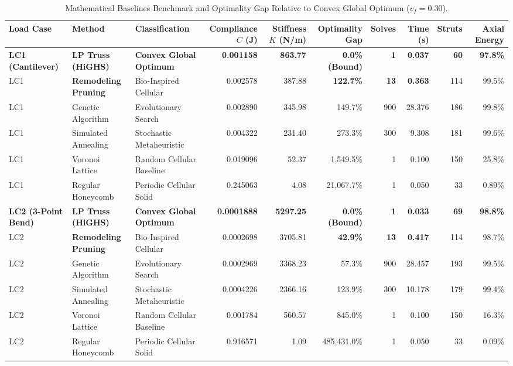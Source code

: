 \documentclass[10pt,journal,compsoc]{IEEEtran}
\begin{document}
\begin{table}[t]
\caption{Mathematical Baselines Benchmark and Optimality Gap Relative to Convex Global Optimum ($v_f = 0.30$).}
\label{tab:baselines_gap}
\centering
\scriptsize
\begin{tabular}{lllrrrrrrr}
\toprule
Load Case & Method & Classification & Compliance $C$ (J) & Stiffness $K$ (N/m) & Optimality Gap & Solves & Time (s) & Struts & Axial Energy \\
\midrule
\textbf{LC1 (Cantilever)} & \textbf{LP Truss (HiGHS)} & \textbf{Convex Global Optimum} & \textbf{0.001158} & \textbf{863.77} & \textbf{0.0\% (Bound)} & \textbf{1} & \textbf{0.037} & \textbf{60} & \textbf{97.8\%} \\
LC1 & \textbf{Remodeling Pruning} & Bio-Inspired Cellular & 0.002578 & 387.88 & \textbf{122.7\%} & \textbf{13} & \textbf{0.363} & 114 & 99.5\% \\
LC1 & Genetic Algorithm & Evolutionary Search & 0.002890 & 345.98 & 149.7\% & 900 & 28.376 & 186 & 99.8\% \\
LC1 & Simulated Annealing & Stochastic Metaheuristic & 0.004322 & 231.40 & 273.3\% & 300 & 9.308 & 181 & 99.6\% \\
LC1 & Voronoi Lattice & Random Cellular Baseline & 0.019096 & 52.37 & 1,549.5\% & 1 & 0.100 & 150 & 25.8\% \\
LC1 & Regular Honeycomb & Periodic Cellular Solid & 0.245063 & 4.08 & 21,067.7\% & 1 & 0.050 & 33 & 0.89\% \\
\midrule
\textbf{LC2 (3-Point Bend)} & \textbf{LP Truss (HiGHS)} & \textbf{Convex Global Optimum} & \textbf{0.0001888} & \textbf{5297.25} & \textbf{0.0\% (Bound)} & \textbf{1} & \textbf{0.033} & \textbf{69} & \textbf{98.8\%} \\
LC2 & \textbf{Remodeling Pruning} & Bio-Inspired Cellular & 0.0002698 & 3705.81 & \textbf{42.9\%} & \textbf{13} & \textbf{0.417} & 114 & 98.7\% \\
LC2 & Genetic Algorithm & Evolutionary Search & 0.0002969 & 3368.23 & 57.3\% & 900 & 28.457 & 193 & 99.5\% \\
LC2 & Simulated Annealing & Stochastic Metaheuristic & 0.0004226 & 2366.16 & 123.9\% & 300 & 10.178 & 179 & 99.4\% \\
LC2 & Voronoi Lattice & Random Cellular Baseline & 0.001784 & 560.57 & 845.0\% & 1 & 0.100 & 150 & 16.3\% \\
LC2 & Regular Honeycomb & Periodic Cellular Solid & 0.916571 & 1.09 & 485,431.0\% & 1 & 0.050 & 33 & 0.09\% \\
\midrule

\end{tabular}
\end{table}
\end{document}
